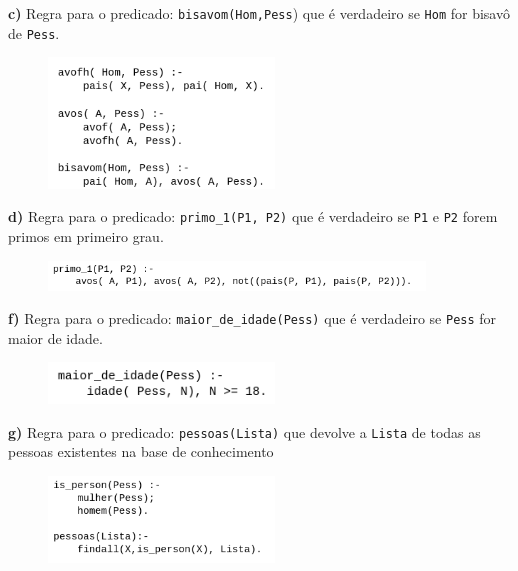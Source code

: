 \documentclass{article}
\begin{document}
    \textbf{c)} Regra para o predicado: \texttt{bisavom(Hom,Pess}) que é verdadeiro se \texttt{Hom} for bisavô de \texttt{Pess}.

    \begin{figure}[H]
        \centering
        \includegraphics[width=6cm]{img/4c.png}
    \end{figure}

    \textbf{d)} Regra para o predicado: \texttt{primo\_1(P1, P2)} que é verdadeiro se \texttt{P1} e \texttt{P2} forem primos em primeiro grau.

    \begin{figure}[H]
        \centering
        \includegraphics[width=10cm]{img/4d.png}
    \end{figure}

    \textbf{f)} Regra para o predicado: \texttt{maior\_de\_idade(Pess)} que é verdadeiro se \texttt{Pess} for maior de idade.

    \begin{figure}[H]
        \centering
        \includegraphics[width=6cm]{img/4f.png}
    \end{figure}

    \newpage

    \textbf{g)} Regra para o predicado: \texttt{pessoas(Lista)} que devolve a \texttt{Lista} de todas as pessoas existentes na base de conhecimento

    \begin{figure}[H]
        \centering
        \includegraphics[width=6cm]{img/4g.png}
    \end{figure}
\end{document}
